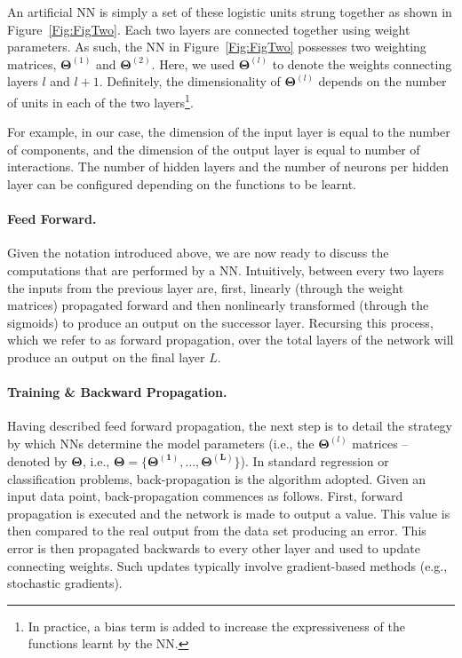 An artificial NN is simply a set of these logistic units strung together as shown in Figure~\ref{Fig:FigTwo}. Each two layers are connected together using weight parameters. As such, the NN in Figure~\ref{Fig:FigTwo} possesses two weighting matrices, $\bm{\Theta}^{(1)}$ and $\bm{\Theta}^{(2)}$. Here, we used $\bm{\Theta}^{(l)}$ to denote the weights connecting layers $l$ and $l+1$. Definitely, the dimensionality of $\bm{\Theta}^{(l)}$ depends on the number of units in each of the two layers\footnote{
In practice, a bias term is added to increase the expressiveness of the functions learnt by the NN.}. 

For example, in our case, the dimension of the input layer is equal to the number of components, and the dimension of the output layer is equal to number of interactions. The number of hidden layers and the number of neurons per hidden layer can be configured depending on the functions to be learnt. 
%

\paragraph{Feed Forward.}
Given the notation introduced above, we are now ready to discuss the computations that are performed by a NN. Intuitively, between every two layers the inputs from the previous layer are, first, linearly (through the weight matrices) propagated forward and then nonlinearly transformed (through the sigmoids) to produce an output on the successor layer. Recursing this process, which we refer to as forward propagation, over the total layers of the network will produce an output on the final layer $L$. 
%

\paragraph{Training \& Backward Propagation.} Having described feed forward propagation, the next step is to detail the strategy by which NNs determine the model parameters (i.e., the $\bm{\Theta}^{(l)}$ matrices -- denoted by $\bm{\Theta}$, i.e., $\bm{\Theta} = \{\bm{\Theta^{(1)}}, \dots, \bm{\Theta^{(L)}}\}$). In standard regression or classification problems, back-propagation is the algorithm adopted. Given an input data point, back-propagation commences as follows. First, forward propagation is executed and the network is made to output a value. This value is then compared to the real output from the data set producing an error. This error is then propagated backwards to every other layer and used to update connecting weights. Such updates typically involve gradient-based methods (e.g., stochastic gradients). 